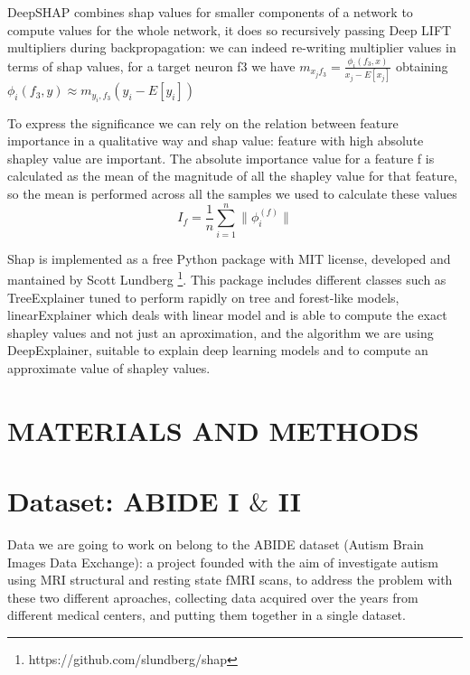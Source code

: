 \documentclass[11pt]{report}
\begin{document}
DeepSHAP combines shap values for smaller components of a network to compute values for the whole network, it does so recursively passing Deep LIFT multipliers during backpropagation: we can indeed re-writing multiplier values in terms of shap values, for a target neuron f3 we have $m_{x_j f_3} = \frac{\phi_i(f_3, x)}{x_j - E[x_j]}$ obtaining $\phi_i(f_3, y) \approx m_{y_i, f_3}(y_i - E[y_i])$


To express the significance we can rely on the relation between feature importance in a qualitative way and shap value: feature with high absolute shapley value are important.
The absolute importance value for a feature f is calculated as the mean of the magnitude of all the shapley value for that feature, so the mean is performed across all the samples we used to calculate these values
\begin{equation}\label{eq:shap_magnitude}
I_f = \frac{1}{n} \sum_{i = 1}^n \|\phi_i^{(f)}\|
\end{equation}

Shap is implemented as a free Python package with MIT license, developed and mantained by Scott Lundberg \footnote{https://github.com/slundberg/shap}.
This package includes different classes such as TreeExplainer tuned to perform rapidly on tree and forest-like models, linearExplainer which deals with linear model and is able to compute the exact shapley values and not just an aproximation, and the algorithm we are using DeepExplainer, suitable to explain deep learning models and to compute an approximate value of shapley values.





\chapter*{MATERIALS AND METHODS}

\chapter{Dataset: ABIDE I $\&$ II}


Data we are going to work on belong to the ABIDE dataset (Autism Brain Images Data Exchange): a project founded with the aim of investigate autism using MRI structural and resting state fMRI scans, to address the problem with these two different aproaches, collecting data acquired over the years from different medical centers, and putting them together in a single dataset.
\end{document}
